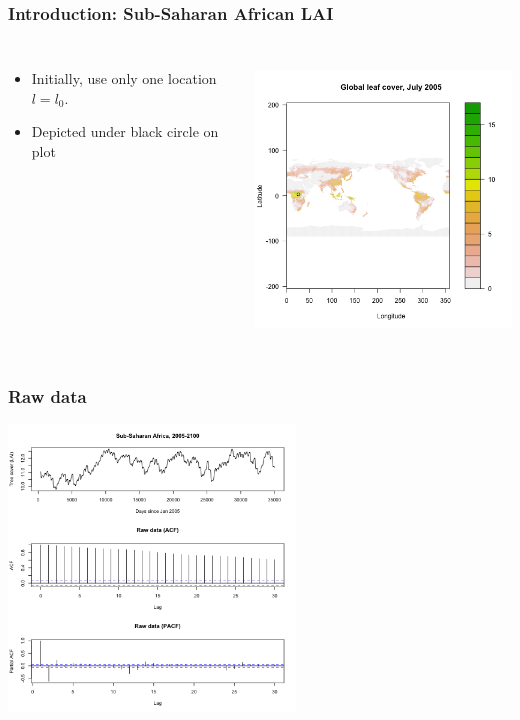\documentclass{beamer}
\begin{document}
\begin{frame}
    \frametitle{Introduction: Sub-Saharan African LAI}
    \begin{columns}

        \column{2in}
            \begin{itemize}
                \item Initially, use only one location $l=l_0$.
                \item Depicted under black circle on plot
            \end{itemize}

        \column{3in}
            \includegraphics[height=3in]{../img/LAI_global_t0.png}

    \end{columns}
\end{frame}


\begin{frame}
    \frametitle{Raw data}
    \includegraphics[height=3in]{../img/pacf_acf_raw.png}
\end{frame}
\end{document}
